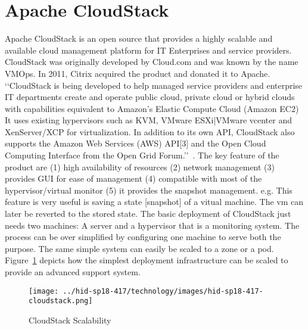 
\section{Apache CloudStack}
Apache CloudStack is an open source that provides a highly scalable
and available cloud management platform for IT Enterprises and service
providers. CloudStack was originally developed by Cloud.com and was
known by the name VMOps.  In 2011, Citrix acquired the product and
donated it to Apache.
‘‘CloudStack is being developed to help managed service providers and
enterprise IT departments create and operate public cloud, private
cloud or hybrid clouds with capabilities equivalent to Amazon's
Elastic Compute Cloud (Amazon EC2) It uses existing hypervisors such
as KVM, VMware ESXi|VMware vcenter and XenServer/XCP for
virtualization. In addition to its own API, CloudStack also supports
the Amazon Web Services (AWS) API[3] and the Open Cloud Computing
Interface from the Open Grid Forum.’’~\cite{hid-sp18-417-wiki-cloudStack}.
The key feature of the product are 
 (1) high availability of resources
 (2) network management
 (3) provides GUI for ease of management
 (4) compatible with most of the hypervisor/virtual monitor
 (5) it provides the snapshot management. e.g. This feature is 
very useful is saving a state [snapshot] of a vitual machine. 
The vm can later be reverted to the stored state.  
The basic deployment of CloudStack just needs two machines: 
 A server and a hypervisor that is a monitoring system.  The process
can be over simplified by configuring one machine to serve both the
purpose.
The same simple system can easily be scaled to a zone or a pod.
Figure~\ref{F:cloudstack-scalabuility} depicts how the simplest
deployment infrastructure can be scaled to provide an advanced support
system.
\begin{figure}[htb]
  \texttt{[image: ../hid-sp18-417/technology/images/hid-sp18-417-cloudstack.png]}
  \caption{CloudStack Scalability~\cite{hid-sp18-417-cloudstack-scaling}}
  \label{F:cloudstack-scalabuility}
\end{figure}
